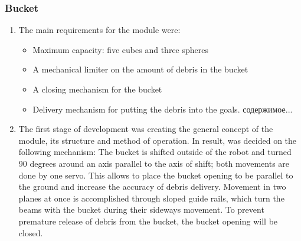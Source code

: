 \subsubsection{Bucket}

  \begin{enumerate}
    \item The main requirements for the module were:
  	  \begin{itemize}
        \item Maximum capacity: five cubes and three spheres
        \item A mechanical limiter on the amount of debris in the bucket 
        \item A closing mechanism for the bucket
        \item Delivery mechanism for putting the debris into the goals.  содержимое...
  	  \end{itemize}  
    \item The first stage of development was creating the general concept of the module, its structure and method of operation. In result, was decided on the following mechanism: 
    The bucket is shifted outside of the robot and turned 90 degrees around an axis parallel to the axis of shift;
    both movements are done by one servo.
    This allows to place the bucket opening to be parallel to the ground and increase the accuracy of debris delivery. Movement in two planes at once is accomplished through sloped guide rails, which turn the beams with the bucket during their sideways movement. To prevent premature release of debris from the bucket, the bucket opening will be closed. 
    

\end{enumerate}
